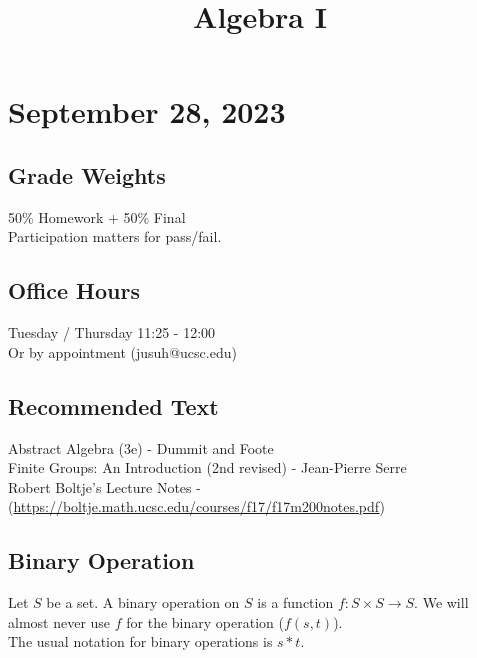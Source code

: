 \documentclass[11pt]{article}
\date{}
\title{Algebra I}
\newcommand{\0}{\emptyset}
\begin{document}
\maketitle
\section*{September 28, 2023}
\label{sec:org34070e0}
\subsection*{Grade Weights}
\label{sec:orgde0ddfc}
50\% Homework + 50\% Final\\[0pt]
Participation matters for pass/fail.\\[0pt]
\subsection*{Office Hours}
\label{sec:orgb58394d}
Tuesday / Thursday 11:25 - 12:00\\[0pt]
Or by appointment (jusuh@ucsc.edu)\\[0pt]
\subsection*{Recommended Text}
\label{sec:orgcb5d7be}
Abstract Algebra (3e) - Dummit and Foote\\[0pt]
Finite Groups: An Introduction (2nd revised) - Jean-Pierre Serre\\[0pt]
Robert Boltje's Lecture Notes - (\url{https://boltje.math.ucsc.edu/courses/f17/f17m200notes.pdf})\\[0pt]
\subsection*{Binary Operation}
\label{sec:org4b44257}
Let \(S\) be a set. A binary operation on \(S\) is a function \(f:S\times S\to S\). We will almost never use \(f\) for the binary operation (\(f(s,t)\)).\\[0pt]
The usual notation for binary operations is \(s*t\).\\[0pt]
\end{document}
